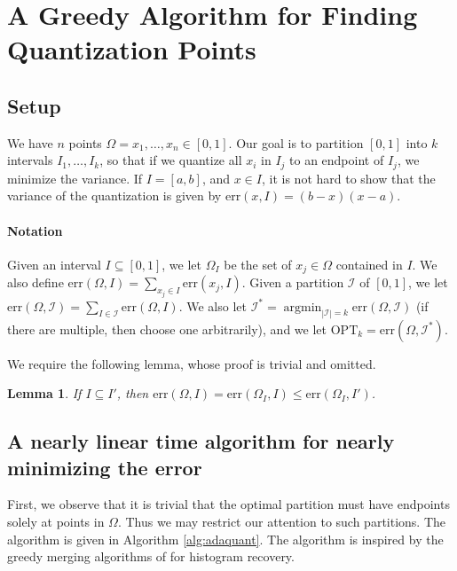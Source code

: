 \documentclass{article}
\newcommand{\err}{\ensuremath{\mathrm{err}}}
\newcommand{\setX}{\Omega}
\newcommand{\setI}{\mathcal{I}}
\newcommand{\OPT}{\ensuremath{\mathrm{OPT}}}
\DeclareMathOperator*{\argmin}{argmin}
\newtheorem{lemma}{Lemma}
\begin{document}
\section{A Greedy Algorithm for Finding Quantization Points}
\subsection{Setup}
We have $n$ points $\setX = x_1, \ldots, x_n \in [0, 1]$.
Our goal is to partition $[0, 1]$ into $k$ intervals $I_1, \ldots, I_k$, so that if we quantize all $x_i$ in $I_j$ to an endpoint of $I_j$, we minimize the variance.
If $I = [a, b]$, and $x \in I$, it is not hard to show that the variance of the quantization is given by $\err (x, I) = (b - x) (x - a)$.

\paragraph{Notation} Given an interval $I \subseteq [0, 1]$, we let $\setX_I$ be the set of $x_j \in \setX$ contained in $I$.
We also define $\err (\setX, I) = \sum_{x_j \in I} \err (x_j, I)$.
Given a partition $\setI$ of $[0, 1]$, we let $\err (\setX, \setI) = \sum_{I \in \setI} \err (\setX, I)$.
We also let $\setI^* = \argmin_{|\setI| = k} \err (\setX, \setI)$ (if there are multiple, then choose one arbitrarily), and we let $\OPT_k = \err(\setX, \setI^*)$.

We require the following lemma, whose proof is trivial and omitted.
\begin{lemma}
\label{lem:subset}
If $I \subseteq I'$, then $\err(\setX, I) = \err (\setX_I, I) \leq \err (\setX_I, I')$.
\end{lemma}

\subsection{A nearly linear time algorithm for nearly minimizing the error}
First, we observe that it is trivial that the optimal partition must have endpoints solely at points in $\setX$.
Thus we may restrict our attention to such partitions.
The algorithm is given in Algorithm \ref{alg:adaquant}.
The algorithm is inspired by the greedy merging algorithms of \cite{ADHLS15,ADLS17} for histogram recovery.
\end{document}
